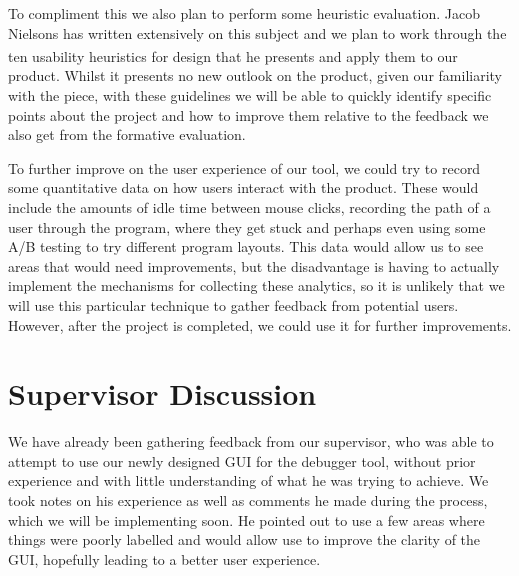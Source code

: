 \documentclass[10pt, a4paper]{article}
\begin{document}
To compliment this we also plan to perform some heuristic evaluation. Jacob Nielsons has written extensively on this subject and we plan to work through the ten usability heuristics for design that he presents\textsuperscript{\cite{heuristic}} and apply them to our product. Whilst it presents no new outlook on the product, given our familiarity with the piece, with these guidelines we will be able to quickly identify specific points about the project and how to improve them relative to the feedback we also get from the formative evaluation. 

To further improve on the user experience of our tool, we could try to record some quantitative data on how users interact with the product. These would include the amounts of idle time between mouse clicks, recording the path of a user through the program, where they get stuck and perhaps even using some A/B testing to try different program layouts. This data would allow us to see areas that would need improvements, but the disadvantage is having to actually implement the mechanisms for collecting these analytics, so it is unlikely that we will use this particular technique to gather feedback from potential users. However, after the project is completed, we could use it for further improvements.

\section{Supervisor Discussion}

We have already been gathering feedback from our supervisor, who was able to attempt to use our newly designed GUI for the debugger tool, without prior experience and with little understanding of what he was trying to achieve. We took notes on his experience as well as comments he made during the process, which we will be implementing soon. He pointed out to use a few areas where things were poorly labelled and would allow use to improve the clarity of the GUI, hopefully leading to a better user experience.
\end{document}
